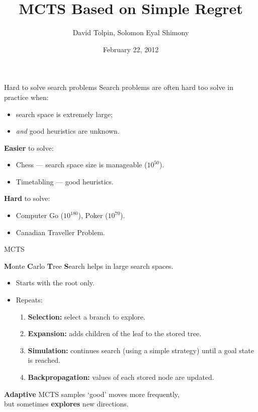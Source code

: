 \documentclass{beamer}
\title{MCTS Based on Simple Regret}
\author{David Tolpin, Solomon Eyal Shimony}
\institute{Ben-Gurion University of the Negev\\Beer Sheva, Israel}
\date{February 22, 2012}
\begin{document}
\begin{frame}
\titlepage
\end{frame}

\begin{frame}{Hard to solve search problems}
Search problems are often hard too solve in practice when:
\begin{itemize}
\item search space is extremely large;
\item {\it and} good heuristics are unknown.
\end{itemize}
\textbf{Easier} to solve:
\begin{itemize}
\item Chess --- search space size is manageable ($10^{50}$).
\item Timetabling --- good heuristics.
\end{itemize}
\textbf{Hard} to solve:
\begin{itemize}
\item Computer Go ($10^{180}$), Poker ($10^{70}$).
\item Canadian Traveller Problem.
\end{itemize}
\end{frame}

\begin{frame}{MCTS}

{\bf M}onte {\bf C}arlo {\bf T}ree {\bf S}earch helps in large search spaces.
\begin{itemize}
\item<+-> Starts with the root only.
\item<+-> Repeats:
  \begin{enumerate}
    \item \textbf{Selection:} select a branch to explore.
    \item<+-> \textbf{Expansion:} adds children of the leaf to the stored
      tree.
    \item<+-> \textbf{Simulation:} continues search (using a simple
      strategy) until a goal state is reached.
    \item<+-> \textbf{Backpropagation:} values of each stored node 
      are updated.
  \end{enumerate}
\end{itemize}
\vspace{1em}
\textbf{Adaptive} MCTS samples `good' moves more frequently,\\
but sometimes {\bf explores} new directions.
\end{frame}
\end{document}

